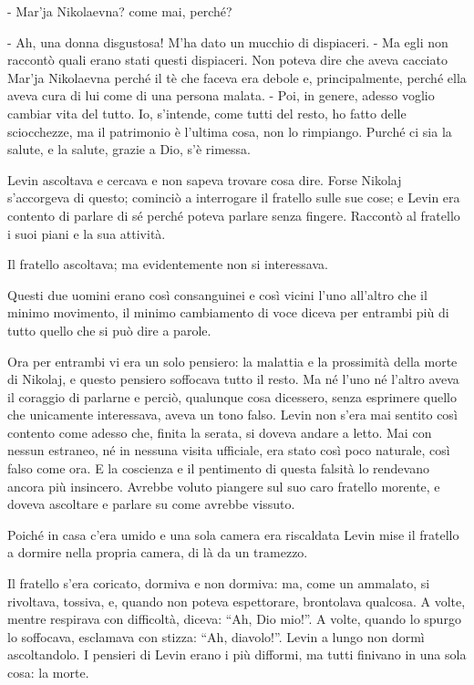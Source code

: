 - Mar'ja Nikolaevna? come mai, perché? 

- Ah, una donna disgustosa! M'ha dato un mucchio di dispiaceri. - Ma egli non raccontò quali erano stati questi dispiaceri. Non poteva dire che aveva cacciato Mar'ja Nikolaevna perché il tè che faceva era debole e, principalmente, perché ella aveva cura di lui come di una persona malata. - Poi, in genere, adesso voglio cambiar vita del tutto. Io, s'intende, come tutti del resto, ho fatto delle sciocchezze, ma il patrimonio è l'ultima cosa, non lo rimpiango. Purché ci sia la salute, e la salute, grazie a Dio, s'è rimessa. 

Levin ascoltava e cercava e non sapeva trovare cosa dire. Forse Nikolaj s'accorgeva di questo; cominciò a interrogare il fratello sulle sue cose; e Levin era contento di parlare di sé perché poteva parlare senza fingere. Raccontò al fratello i suoi piani e la sua attività. 

Il fratello ascoltava; ma evidentemente non si interessava. 

Questi due uomini erano così consanguinei e così vicini l'uno all'altro che il minimo movimento, il minimo cambiamento di voce diceva per entrambi più di tutto quello che si può dire a parole. 

Ora per entrambi vi era un solo pensiero: la malattia e la prossimità della morte di Nikolaj, e questo pensiero soffocava tutto il resto. Ma né l'uno né l'altro aveva il coraggio di parlarne e perciò, qualunque cosa dicessero, senza esprimere quello che unicamente interessava, aveva un tono falso. Levin non s'era mai sentito così contento come adesso che, finita la serata, si doveva andare a letto. Mai con nessun estraneo, né in nessuna visita ufficiale, era stato così poco naturale, così falso come ora. E la coscienza e il pentimento di questa falsità lo rendevano ancora più insincero. Avrebbe voluto piangere sul suo caro fratello morente, e doveva ascoltare e parlare su come avrebbe vissuto. 

Poiché in casa c'era umido e una sola camera era riscaldata Levin mise il fratello a dormire nella propria camera, di là da un tramezzo. 

Il fratello s'era coricato, dormiva e non dormiva: ma, come un ammalato, si rivoltava, tossiva, e, quando non poteva espettorare, brontolava qualcosa. A volte, mentre respirava con difficoltà, diceva: ``Ah, Dio mio!''. A volte, quando lo spurgo lo soffocava, esclamava con stizza: ``Ah, diavolo!''. Levin a lungo non dormì ascoltandolo. I pensieri di Levin erano i più difformi, ma tutti finivano in una sola cosa: la morte. 

